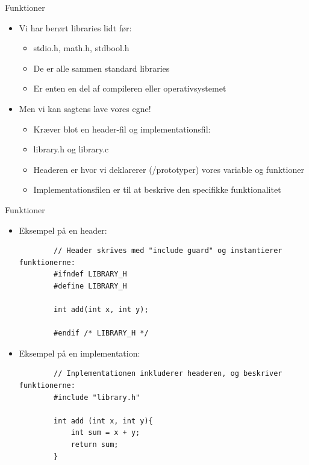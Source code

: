 \documentclass{beamer}
\begin{document}
\begin{frame}[fragile]{Funktioner}
	\begin{itemize}
		\item{Vi har berørt libraries lidt før:}
		\begin{itemize}
			\item{{\color{dkgreen}stdio.h}, {\color{dkgreen}math.h}, {\color{dkgreen}stdbool.h}}
			\item{De er alle sammen standard libraries}
			\item{Er enten en del af compileren eller operativsystemet}
		\end{itemize}
		\item{Men vi kan sagtens lave vores egne!}
		\begin{itemize}
			\item{Kræver blot en header-fil og implementationsfil:}
			\item{{\color{C_lightblue}library.h} og {\color{C_lightblue}library.c}}
			\item{Headeren er hvor vi deklarerer (/prototyper) vores variable og funktioner}
			\item{Implementationsfilen er til at beskrive den specifikke funktionalitet}
		\end{itemize}
	\end{itemize}
\end{frame}


\begin{frame}[fragile]{Funktioner}
	\begin{itemize}
		\item{Eksempel på en header:}
		\begin{lstlisting}
		// Header skrives med "include guard" og instantierer funktionerne:
		#ifndef LIBRARY_H
		#define LIBRARY_H

		int add(int x, int y);

		#endif /* LIBRARY_H */
		\end{lstlisting}
		\item{Eksempel på en implementation:}
		\begin{lstlisting}
		// Inplementationen inkluderer headeren, og beskriver funktionerne:
		#include "library.h"
		
		int add (int x, int y){
			int sum = x + y;
			return sum;
		}
		\end{lstlisting}
	\end{itemize}
\end{frame}
\end{document}
